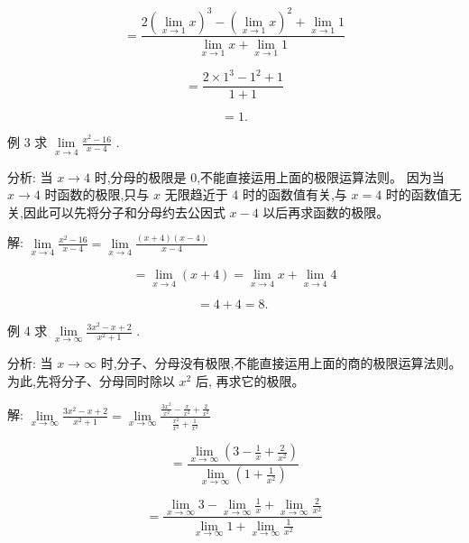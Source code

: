 \documentclass[lang=cn,newtx,12pt,scheme=chinese]{elegantbook}
\begin{document}
\[
= \frac{2{\left( \mathop{\lim }\limits_{{x \rightarrow 1}}x\right) }^{3} - {\left( \mathop{\lim }\limits_{{x \rightarrow 1}}x\right) }^{2} + \mathop{\lim }\limits_{{x \rightarrow 1}}1}{\mathop{\lim }\limits_{{x \rightarrow 1}}x + \mathop{\lim }\limits_{{x \rightarrow 1}}1}
\]

\[
= \frac{2 \times {1}^{3} - {1}^{2} + 1}{1 + 1}
\]

\[
= 1\text{.}
\]

例 3 求 \(\mathop{\lim }\limits_{{x \rightarrow 4}}\frac{{x}^{2} - {16}}{x - 4}\) .

分析: 当 \(x \rightarrow 4\) 时,分母的极限是 0,不能直接运用上面的极限运算法则。 因为当 \(x \rightarrow 4\) 时函数的极限,只与 \(x\) 无限趋近于 4 时的函数值有关,与 \(x = 4\) 时的函数值无关,因此可以先将分子和分母约去公因式 \(x - 4\) 以后再求函数的极限。

解: \(\mathop{\lim }\limits_{{x \rightarrow 4}}\frac{{x}^{2} - {16}}{x - 4} = \mathop{\lim }\limits_{{x \rightarrow 4}}\frac{\left( {x + 4}\right) \left( {x - 4}\right) }{x - 4}\)

\[
= \mathop{\lim }\limits_{{x \rightarrow 4}}\left( {x + 4}\right) = \mathop{\lim }\limits_{{x \rightarrow 4}}x + \mathop{\lim }\limits_{{x \rightarrow 4}}4
\]

\[
= 4 + 4 = 8\text{. }
\]

例 4 求 \(\mathop{\lim }\limits_{{x \rightarrow \infty }}\frac{3{x}^{2} - x + 2}{{x}^{2} + 1}\) .

分析: 当 \(x \rightarrow \infty\) 时,分子、分母没有极限,不能直接运用上面的商的极限运算法则。 为此,先将分子、分母同时除以 \({x}^{2}\) 后, 再求它的极限。

解: \(\mathop{\lim }\limits_{{x \rightarrow \infty }}\frac{3{x}^{2} - x + 2}{{x}^{2} + 1} = \mathop{\lim }\limits_{{x \rightarrow \infty }}\frac{\frac{3{x}^{2}}{{x}^{2}} - \frac{x}{{x}^{2}} + \frac{2}{{x}^{2}}}{\frac{{x}^{2}}{{x}^{2}} + \frac{1}{{x}^{2}}}\)

\[
= \frac{\mathop{\lim }\limits_{{x \rightarrow \infty }}\left( {3 - \frac{1}{x} + \frac{2}{{x}^{2}}}\right) }{\mathop{\lim }\limits_{{x \rightarrow \infty }}\left( {1 + \frac{1}{{x}^{2}}}\right) }
\]

\[
= \frac{\mathop{\lim }\limits_{{x \rightarrow \infty }}3 - \mathop{\lim }\limits_{{x \rightarrow \infty }}\frac{1}{x} + \mathop{\lim }\limits_{{x \rightarrow \infty }}\frac{2}{{x}^{2}}}{\mathop{\lim }\limits_{{x \rightarrow \infty }}1 + \mathop{\lim }\limits_{{x \rightarrow \infty }}\frac{1}{{x}^{2}}}
\]
\end{document}
